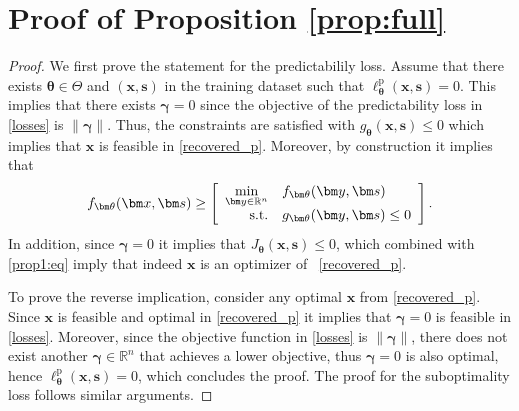 \documentclass{article}
\theoremstyle{plain}
\begin{document}
\section{Proof of Proposition \ref{prop:full}}\label{app:proof:full}
\begin{proof}
We first prove the statement for the predictabilily loss. Assume that there exists  $\bm \theta\in\Theta$ and $(\bm x,\bm s)$ in the training dataset such that $\ell_{\bm\theta}^\text{p}(\bm x,\bm s) = 0$. This implies that there exists  $\bm\gamma = 0$ since the objective of the predictability loss in \eqref{losses} is $\|\bm\gamma\|$. Thus,  the constraints are satisfied with $g_{\bm \theta}(\bm x,\bm s) \leq 0$ which implies that $\bm x$ is feasible in \eqref{recovered_p}. Moreover, by construction  it implies that 
\begin{equation}\label{prop1:eq}
    f_{\bm\theta}(\bm x,\bm s) \geq \left[
    \begin{array}{rl}
    \displaystyle\min_{\bm y\in\mathbb{R}^n}& f_{\bm \theta}(\bm y,\bm s)\\
    {\rm s.t.} & g_{\bm \theta}(\bm y,\bm s) \leq  0\\ 
\end{array}\right].
\end{equation}
In addition, since $\bm\gamma = 0$ it implies that $J_{\bm\theta}(\bm x, \bm s) \leq0$, which combined with \eqref{prop1:eq} imply that indeed $\bm x$ is an optimizer of~ \eqref{recovered_p}. 

To prove the reverse implication, consider any optimal $\bm x$ from \eqref{recovered_p}. Since $\bm x$ is feasible and optimal in \eqref{recovered_p} it implies that  $\bm\gamma=0$ is feasible in \eqref{losses}. Moreover, since the objective function in \eqref{losses} is $\|\bm\gamma\|$, there does not exist another $\bm\gamma\in\mathbb{R}^n$ that achieves a lower objective, thus $\bm\gamma=0$ is also optimal, hence $\ell_{\bm\theta}^\text{p}(\bm x,\bm s)=0$, which concludes the proof. The proof for the suboptimality loss follows similar arguments.
\end{proof}
\end{document}
